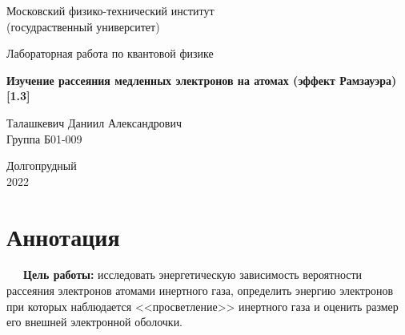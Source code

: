 \documentclass[a4paper, 12pt]{article}%
\begin{document}


\begin{titlepage}

	\newpage
	\begin{center}
		\normalsize Московский физико-технический институт \\(госудраственный 			университет)
	\end{center}

	\vspace{6em}

	\begin{center}
		\Large Лабораторная работа по квантовой физике\\
	\end{center}

	\vspace{1em}

	\begin{center}
		\large \textbf{Изучение рассеяния медленных электронов на атомах (эффект Рамзауэра) [1.3]}
	\end{center}

	\vspace{2em}

	\begin{center}
		\large Талашкевич Даниил Александрович\\
		Группа Б01-009
	\end{center}

	\vspace{\fill}

	\begin{center}
	Долгопрудный \\2022
	\end{center}
	
\end{titlepage}



	\thispagestyle{empty}
	\newpage
	\tableofcontents
	\newpage
	\setcounter{page}{1}



\section{Аннотация}

\ \ \ \textbf{Цель работы:} исследовать энергетическую зависимость вероятности рассеяния электронов атомами инертного газа, определить энергию электронов при которых наблюдается <<просветление>> инертного газа и оценить размер его внешней электронной оболочки.
\end{document}
